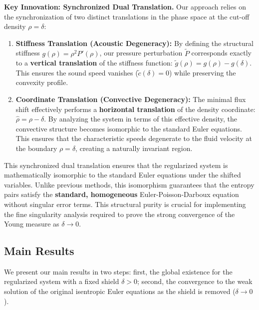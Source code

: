 \documentclass[12pt, reqno]{article}
\theoremstyle{definition}
\numberwithin{equation}{section}
\begin{document}
\textbf{Key Innovation: Synchronized Dual Translation.}
Our approach relies on the synchronization of two distinct translations in the phase space at the cut-off density $\rho=\delta$:
\begin{enumerate}
    \item \textbf{Stiffness Translation (Acoustic Degeneracy):} 
    By defining the structural stiffness $g(\rho) = \rho^2 P'(\rho)$, our pressure perturbation $\tilde{P}$ corresponds exactly to a \textbf{vertical translation} of the stiffness function: $\tilde{g}(\rho) = g(\rho) - g(\delta)$. This ensures the sound speed vanishes ($\tilde{c}(\delta) = 0$) while preserving the convexity profile.
    
    \item \textbf{Coordinate Translation (Convective Degeneracy):} 
The minimal flux shift effectively performs a \textbf{horizontal translation} of the density coordinate: $\hat{\rho} = \rho - \delta$. By analyzing the system in terms of this effective density, the convective structure becomes isomorphic to the standard Euler equations. This ensures that the characteristic speeds degenerate to the fluid velocity at the boundary $\rho=\delta$, creating a naturally invariant region.
\end{enumerate}
This synchronized dual translation ensures that the regularized system is mathematically isomorphic to the standard Euler equations under the shifted variables. Unlike previous methods, this isomorphism guarantees that the entropy pairs satisfy the \textbf{standard, homogeneous} Euler-Poisson-Darboux equation without singular error terms. This structural purity is crucial for implementing the fine singularity analysis required to prove the strong convergence of the Young measure as $\delta \to 0$.

\subsection{Main Results}

We present our main results in two steps: first, the global existence for the regularized system with a fixed shield $\delta > 0$; second, the convergence to the weak solution of the original isentropic Euler equations as the shield is removed ($\delta \to 0$).
\end{document}
